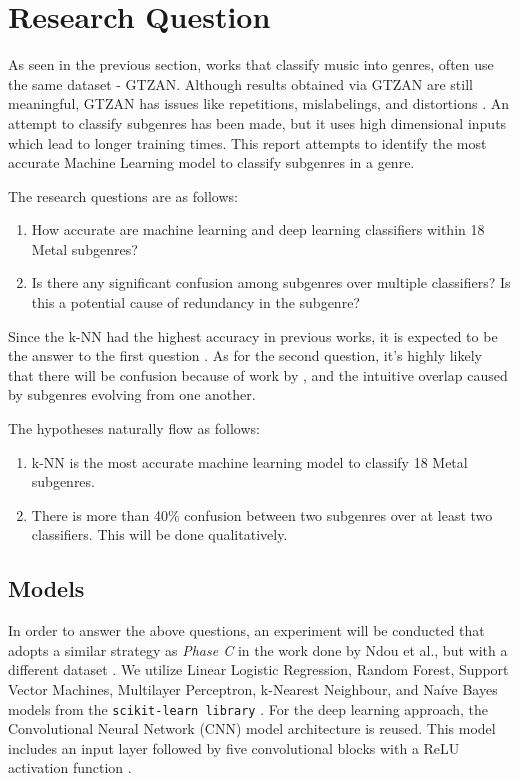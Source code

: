 \section{Research Question}
As seen in the previous section, works that classify music into genres, often use the same dataset - GTZAN. Although results obtained via GTZAN are still meaningful, GTZAN has issues like repetitions, mislabelings, and distortions \cite{sturm2013gtzan}. An attempt to classify subgenres has been made, but it uses high dimensional inputs which lead to longer training times. This report attempts to identify the most accurate Machine Learning model to classify subgenres in a genre.

The research questions are as follows:
\begin{enumerate}
  \item How accurate are machine learning and deep learning classifiers within 18 Metal subgenres?
  \item Is there any significant confusion among subgenres over multiple classifiers? Is this a potential cause of redundancy in the subgenre?
\end{enumerate}

Since the k-NN had the highest accuracy in previous works, it is expected to be the  answer to the first question \cite{ndou2021music}. As for the second question, it's highly likely that there will be confusion because of work by \cite{doi:10.1080/09298215.2020.1761399}, and the intuitive overlap caused by subgenres evolving from one another.

The hypotheses naturally flow as follows:
\begin{enumerate}
  \item k-NN is the most accurate machine learning model to classify 18 Metal subgenres.
  \item There is more than 40\% confusion between two subgenres over at least two classifiers. This will be done qualitatively.
\end{enumerate}

\subsection{Models}
In order to answer the above questions, an experiment will be conducted that adopts a similar strategy as \textit{Phase C} in the work done by Ndou et al., but with a different dataset \cite{ndou2021music}. We utilize Linear Logistic Regression, Random Forest, Support Vector Machines, Multilayer Perceptron, k-Nearest Neighbour, and Naíve Bayes models from the \verb|scikit-learn library| \cite{pedregosa2011scikit}. For the deep learning approach, the Convolutional Neural Network (CNN) model architecture is reused. This model includes an input layer followed by five convolutional blocks with a ReLU activation function \cite{gulli2017deep}.

